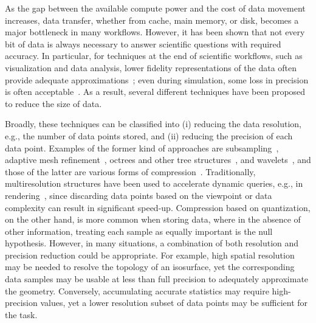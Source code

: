 As the gap between the available compute power and the cost of data movement increases, data
transfer, whether from cache, main memory, or disk, becomes a major bottleneck in many workflows.
However, it has been shown that not every bit of data is always necessary to answer scientific
questions with required accuracy. In particular, for techniques at the end of scientific workflows,
such as visualization and data analysis, lower fidelity representations of the data often provide
adequate approximations~\cite{woodring2011,covra2012,compression_sim2013}; even during
simulation, some loss in precision is often
acceptable~\cite{compression_sim2013,doi:10.1177/1094342018762036}. As a result, several different
techniques have been proposed to reduce the size of data. 

Broadly, these techniques can be classified into (i) reducing the data resolution, e.g., the number
of data points stored, and (ii) reducing the precision of each data point. Examples of the former
kind of approaches are subsampling~\cite{idx2001}, adaptive mesh refinement~\cite{amr1989}, octrees
and other tree structures~\cite{hierarchical1984}, and wavelets~\cite{woodring2011}, and those of
the latter are various forms of
compression~\cite{fpzip,isabela,zfp2014,sz,vq1992,compression_domain2003,sqe}. Traditionally,
multiresolution structures have been used to accelerate dynamic queries, e.g., in
rendering~\cite{multires_octree1999}, since discarding data points based on the viewpoint or data
complexity can result in significant speed-up. Compression based on quantization, on the other hand,
is more common when storing data, where in the absence of other information, treating each sample as
equally important is the null hypothesis. However, in many situations, a combination of both
resolution and precision reduction could be appropriate. For example, high spatial resolution may be
needed to resolve the topology of an isosurface, yet the corresponding data samples may be usable at
less than full precision to adequately approximate the geometry. Conversely, accumulating accurate
statistics may require high-precision values, yet a lower resolution subset of data points may be
sufficient for the task.

